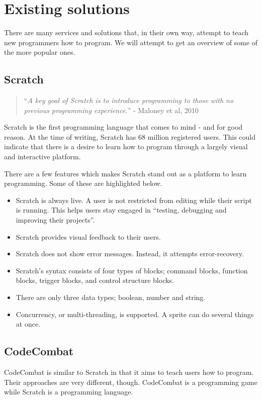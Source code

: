 \section{Existing solutions}\label{sec:existing_solutions}
There are many services and solutions that, in their own way, attempt to teach new programmers how to program.
We will attempt to get an overview of some of the more popular ones.

\subsection{Scratch}\label{ScratchSection}
\begin{quote}
    ``\emph{A key goal of Scratch is to introduce programming to those with no previous programming experience.}'' - Maloney et al, 2010\cite{maloneyScratchProgrammingLanguage2010}
\end{quote}

Scratch\cite{ScratchImagineProgram} is the first programming language that comes to mind - and for good reason. At the time of writing, Scratch has 68 million registered users\cite{ScratchImagineProgramStatistics}. This could indicate that there is a desire to learn how to program through a largely visual and interactive platform.

There are a few features which makes Scratch stand out as a platform to learn programming. Some of these are highlighted below.
\begin{itemize}
    \item Scratch is always live. A user is not restricted from editing while their script is running. This helps users stay engaged in ``testing, debugging and improving their projects''.
    \item Scratch provides visual feedback to their users.
    \item Scratch does not show error messages. Instead, it attempts error-recovery.
    \item Scratch's syntax consists of four types of blocks; command blocks, function blocks, trigger blocks, and control structure blocks.
    \item There are only three data types; boolean, number and string.
    \item Concurrency, or multi-threading, is supported. A sprite can do several things at once.
\end{itemize}\cite{maloneyScratchProgrammingLanguage2010}

\subsection{CodeCombat}\label{CodeCombatSection}
CodeCombat\cite{CodeCombatCodingGames} is similar to Scratch in that it aims to teach users how to program.
Their approaches are very different, though. CodeCombat is a programming game while Scratch is a programming language.

